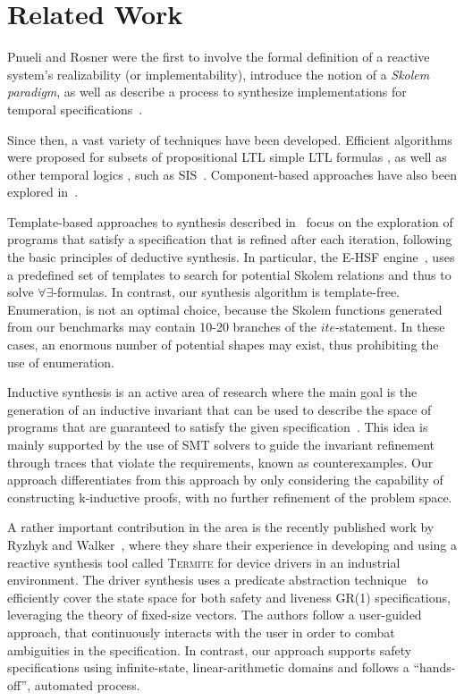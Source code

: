 \section{Related Work}
\label{sec:related}

Pnueli and Rosner were the
first to involve the formal definition of a reactive system's realizability (or
implementability), introduce the notion of a \emph{Skolem paradigm}, as well as
describe a process to synthesize implementations for temporal
specifications~\cite{DBLP:conf/popl/PnueliR89}.	

Since then, a vast variety of techniques have been developed. Efficient
algorithms were proposed for subsets of propositional LTL
\cite{Klein10,ehlers2010symbolic,cheng2016structural} simple
LTL formulas \cite{Bohy12,Tini03}, as well as other temporal
logics \cite{monmege2016real,Hamza10}, such as SIS~\cite{Aziz95}.
Component-based approaches have also been explored in~\cite{Chatterjee07}.

Template-based approaches to
synthesis described in~\cite{srivastava2013template,beyene2014constraint} focus on the exploration of programs that satisfy a specification that is refined after each
iteration, following the basic principles of deductive synthesis.
In particular, the \textsc{E-HSF} engine~\cite{beyene2014constraint}, 
uses a predefined set of templates to search for potential Skolem
relations and thus to solve $\forall\exists$-formulas. 
In contrast, our synthesis algorithm is template-free.
Enumeration, is not an optimal choice, because the Skolem functions generated from
our benchmarks may contain 10-20 branches of the $ite$-statement. In these
cases, an enormous number of potential shapes may exist, thus prohibiting the use of
enumeration. 

Inductive synthesis is an active area of research where the main
goal is the generation of an inductive invariant that can be used to describe the space of programs that are guaranteed to satisfy the given specification~\cite{flener2001inductive}. This idea is mainly supported by the use of SMT solvers to guide the invariant refinement through traces that violate the requirements, known as counterexamples. Our approach differentiates from this approach by only considering the capability of constructing k-inductive proofs, with no further refinement of the problem space.

A rather important contribution in the area is the recently published work by
Ryzhyk and Walker~\cite{ryzhykdeveloping}, where they share their
experience in developing and using a reactive synthesis tool called \textsc{Termite} for
device drivers in an industrial environment. The driver synthesis uses
a predicate abstraction technique~\cite{walker2014predicate} to efficiently
cover the state space for both safety and liveness GR(1) specifications,
leveraging the theory of fixed-size vectors. The authors follow a user-guided
approach, that continuously interacts with the user in order to combat ambiguities in the specification.
In contrast, our approach supports safety specifications using infinite-state,
linear-arithmetic domains and follows a ``hands-off'', automated process.
